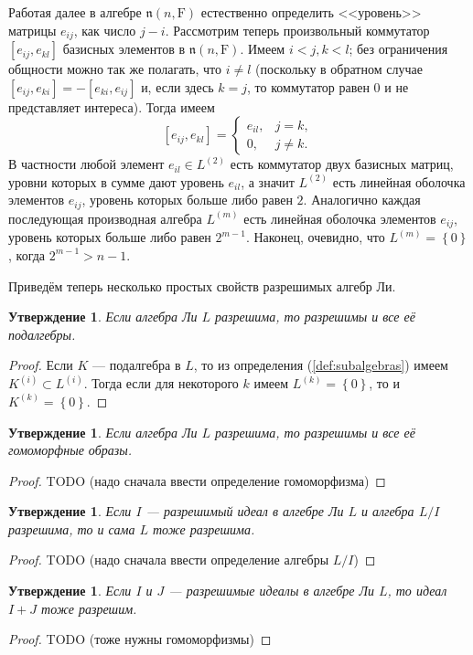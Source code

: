 \documentclass[a4paper, 12pt]{article}
\newtheorem{proposition}[theorem]{Утверждение}
\theoremstyle{definition}
\begin{document}
Работая далее в алгебре \({ \mathfrak{n}(n, \mathrm F) }\) естественно определить <<уровень>> матрицы \({ e_{ij} }\), как число \({ j - i }\). Рассмотрим теперь произвольный коммутатор \({ [e_{ij}, e_{kl}] }\) базисных элементов в \({ \mathfrak{n}(n, \mathrm F) }\). Имеем \({ i < j, k < l }\); без ограничения общности можно так же полагать, что \({ i \neq l }\) (поскольку в обратном случае \({ [e_{ij}, e_{ki}] = -[e_{ki}, e_{ij}] }\) и, если здесь \({ k = j }\), то коммутатор равен \({ 0 }\) и не представляет интереса). Тогда имеем
\[
    [e_{ij}, e_{kl}] = \begin{cases}
        e_{il}, & j = k, \\
        0, & j \neq k.
    \end{cases}
\]
В частности любой элемент \({ e_{il} \in L^{(2)} }\) есть коммутатор двух базисных матриц, уровни которых в сумме дают уровень \({ e_{il} }\), а значит \({ L^{(2)} }\) есть линейная оболочка элементов \({ e_{ij} }\), уровень которых больше либо равен \({ 2 }\). Аналогично каждая последующая производная алгебра \({ L^{(m)} }\) есть линейная оболочка элементов \({ e_{ij} }\), уровень которых больше либо равен \({ 2^{m - 1} }\). Наконец, очевидно, что \({ L^{(m)} = \left\{ 0 \right\} }\), когда \({ 2^{m - 1} > n - 1 }\).

Приведём теперь несколько простых свойств разрешимых алгебр Ли.

\begin{proposition}
    Если алгебра Ли \({ L }\) разрешима, то разрешимы и все её подалгебры.
\end{proposition}
\begin{proof}
    Если \({ K }\) --- подалгебра в \({ L }\), то из определения (\ref{def:subalgebras}) имеем \({ K^{(i)} \subset L^{(i)} }\). Тогда если для некоторого \({ k }\) имеем \({ L^{(k)} = \left\{ 0 \right\} }\), то и \({ K^{(k)} = \left\{ 0 \right\} }\).
\end{proof}

\begin{proposition}
    Если алгебра Ли \({ L }\) разрешима, то разрешимы и все её гомоморфные образы.
\end{proposition}
\begin{proof}
    TODO (надо сначала ввести определение гомоморфизма)
\end{proof}

\begin{proposition}
    Если \({ I }\) --- разрешимый идеал в алгебре Ли \({ L }\) и алгебра \({ L / I }\) разрешима, то и сама \({ L }\) тоже разрешима.
\end{proposition}
\begin{proof}
    TODO (надо сначала ввести определение алгебры \({ L / I }\))
\end{proof}

\begin{proposition}
    Если \({ I }\) и \({ J }\) --- разрешимые идеалы в алгебре Ли \({ L }\), то идеал \({ I + J }\) тоже разрешим.
\end{proposition}
\begin{proof}
    TODO (тоже нужны гомоморфизмы)
\end{proof}
\end{document}
